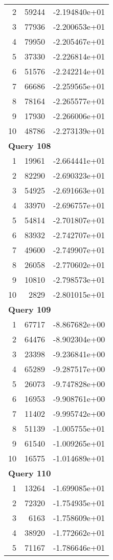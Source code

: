 \begin{longtable}[{p}]{@{}rrp{}@{}}
2 & 59244 & -2.194840e+01 \\
3 & 77936 & -2.200653e+01 \\
4 & 79950 & -2.205467e+01 \\
5 & 37330 & -2.226814e+01 \\
6 & 51576 & -2.242214e+01 \\
7 & 66686 & -2.259565e+01 \\
8 & 78164 & -2.265577e+01 \\
9 & 17930 & -2.266006e+01 \\
10 & 48786 & -2.273139e+01 \\
\midrule
\multicolumn{3}{l}{\bfseries Query 108} \\
1 & 19961 & -2.664441e+01 \\
2 & 82290 & -2.690323e+01 \\
3 & 54925 & -2.691663e+01 \\
4 & 33970 & -2.696757e+01 \\
5 & 54814 & -2.701807e+01 \\
6 & 83932 & -2.742707e+01 \\
7 & 49600 & -2.749907e+01 \\
8 & 26058 & -2.770602e+01 \\
9 & 10810 & -2.798573e+01 \\
10 & 2829 & -2.801015e+01 \\
\midrule
\multicolumn{3}{l}{\bfseries Query 109} \\
1 & 67717 & -8.867682e+00 \\
2 & 64476 & -8.902304e+00 \\
3 & 23398 & -9.236841e+00 \\
4 & 65289 & -9.287517e+00 \\
5 & 26073 & -9.747828e+00 \\
6 & 16953 & -9.908761e+00 \\
7 & 11402 & -9.995742e+00 \\
8 & 51139 & -1.005755e+01 \\
9 & 61540 & -1.009265e+01 \\
10 & 16575 & -1.014689e+01 \\
\midrule
\multicolumn{3}{l}{\bfseries Query 110} \\
1 & 13264 & -1.699085e+01 \\
2 & 72320 & -1.754935e+01 \\
3 & 6163 & -1.758609e+01 \\
4 & 38920 & -1.772662e+01 \\
5 & 71167 & -1.786646e+01 \\

\end{longtable}
